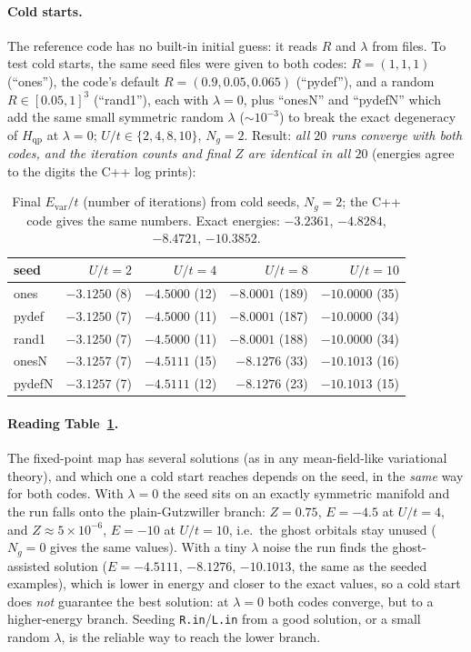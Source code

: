 \documentclass[11pt]{article}
\newcommand{\Ng}{N_{g}}
\newcommand{\Hqp}{H_{\mathrm{qp}}}
\begin{document}
\paragraph{Cold starts.} The reference code has no built-in initial guess:
it reads $R$ and $\lambda$ from files. To test cold starts, the same seed files
were given to both codes: $R=(1,1,1)$ (``ones''), the code's default
$R=(0.9,0.05,0.065)$ (``pydef''), and a random $R\in[0.05,1]^3$
(``rand1''), each with $\lambda=0$, plus ``onesN'' and ``pydefN'' which add the
same small symmetric random $\lambda$ ($\sim10^{-3}$) to break the exact
degeneracy of $\Hqp$ at $\lambda=0$; $U/t\in\{2,4,8,10\}$, $\Ng=2$. Result:
\emph{all $20$ runs converge with both codes, and the iteration counts and
final $Z$ are identical in all $20$} (energies agree to the digits the C++ log
prints):
\begin{table}[h]
\centering
\small
\begin{tabular}{lrrrr}
\toprule
seed & $U/t=2$ & $U/t=4$ & $U/t=8$ & $U/t=10$ \\
\midrule
ones   & $-3.1250$ (8)  & $-4.5000$ (12) & $-8.0001$ (189) & $-10.0000$ (35) \\
pydef  & $-3.1250$ (7)  & $-4.5000$ (11) & $-8.0001$ (187) & $-10.0000$ (34) \\
rand1  & $-3.1250$ (7)  & $-4.5000$ (11) & $-8.0001$ (188) & $-10.0000$ (34) \\
onesN  & $-3.1257$ (7)  & $-4.5111$ (15) & $-8.1276$ (33)  & $-10.1013$ (16) \\
pydefN & $-3.1257$ (7)  & $-4.5111$ (12) & $-8.1276$ (23)  & $-10.1013$ (15) \\
\bottomrule
\end{tabular}
\caption{Final $E_{\mathrm{var}}/t$ (number of iterations) from cold seeds,
$\Ng=2$; the C++ code gives the same numbers. Exact energies: $-3.2361$,
$-4.8284$, $-8.4721$, $-10.3852$.}
\label{tab:cold}
\end{table}

\paragraph{Reading Table~\ref{tab:cold}.} The fixed-point map has several
solutions (as in any mean-field-like variational theory), and which one a cold
start reaches depends on the seed, in the \emph{same} way for both codes. With
$\lambda=0$ the seed sits on an exactly symmetric manifold and the run
falls onto the plain-Gutzwiller branch: $Z=0.75$, $E=-4.5$ at $U/t=4$, and
$Z\approx5\!\times\!10^{-6}$, $E=-10$ at $U/t=10$, i.e.\ the ghost orbitals stay
unused ($\Ng=0$ gives the same values). With a tiny $\lambda$ noise the run
finds the ghost-assisted solution ($E=-4.5111$, $-8.1276$, $-10.1013$, the same
as the seeded examples), which is lower in energy and closer to the exact
values, so a cold start does \emph{not} guarantee the best solution: at
$\lambda=0$ both codes converge, but to a higher-energy branch. Seeding
\texttt{R.in}/\texttt{L.in} from a good solution, or a small random $\lambda$,
is the reliable way to reach the lower branch.
\end{document}
